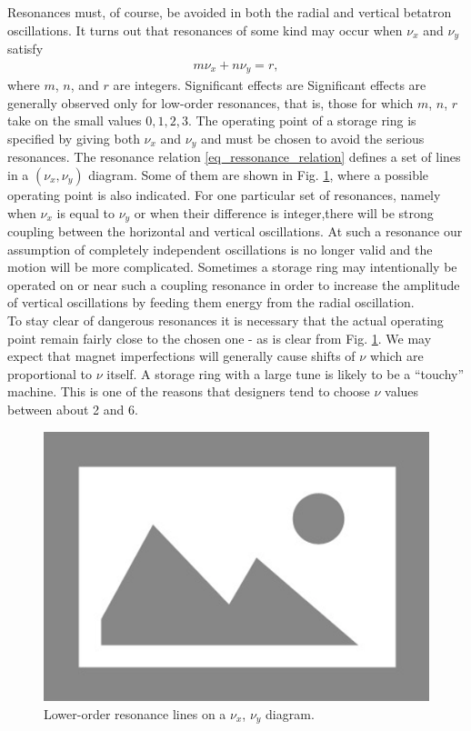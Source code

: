 Resonances must, of course, be avoided in both the radial and vertical betatron oscillations. It turns out that resonances of some kind may occur when $\nu_x$ and $\nu_y$ satisfy
\begin{align}\label{eq_ressonance_relation}
	m \nu_x + n \nu_y = r, 
\end{align}
where $m$, $n$, and $r$ are integers. Significant effects are  Significant effects are generally observed only for low-order resonances, that is, those for which $m$, $n$, $r$ take on the small values $0, 1, 2, 3$. The operating point of a storage ring is specified by giving both $\nu_x$
and $\nu_y$ and must be chosen to avoid the serious resonances. The resonance relation \eqref{eq_ressonance_relation} defines a set of lines in a $(\nu_x, \nu_y)$ diagram. Some of them are shown in Fig. \ref{fig:lower_order_resonance_lines}, where a possible operating point is also indicated. For one particular set of resonances, namely when $\nu_x$ is equal to $\nu_y$ or when their difference is integer,there will be strong coupling between the horizontal and vertical oscillations. At such a resonance our assumption of completely independent oscillations is no longer valid and the motion will be more complicated. Sometimes a storage ring may intentionally be operated on or near such a coupling resonance in order to increase the amplitude of vertical oscillations by feeding them energy from the radial oscillation. \\
To stay clear of dangerous resonances it is necessary that the actual operating point remain fairly close to the chosen one - as is clear from Fig. \ref{fig:lower_order_resonance_lines}. We may expect that magnet imperfections will generally cause shifts of $\nu$ which are proportional to $\nu$ itself. A storage ring with a large tune is likely to be a “touchy” machine. This is one of the reasons that designers tend to choose $\nu$ values between about 2 and 6.

\begin{figure}[!htb]
	\centering
	\includegraphics[width=0.7\linewidth]{./Figuras/placeholder.png}
	\caption{Lower-order resonance lines on a $\nu_x$, $\nu_y$ diagram.}
	\label{fig:lower_order_resonance_lines}
\end{figure}